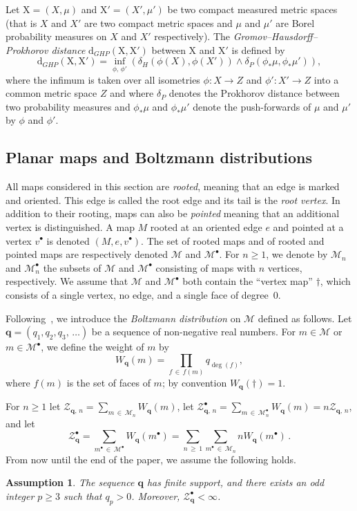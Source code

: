 \documentclass[AHL,Unicode,longabstracts,published]{cedram}
\newtheorem{assumption}{Assumption}
\newcommand{\bfq}{\mathbf{q}}
\newcommand{\cM}{\mathcal{M}}
\newcommand{\cZ}{\mathcal{Z}}
\newcommand{\rX}{\mathrm{X}}
\newcommand{\rXi}{\mathrm{X'}}
\newcommand{\rd}{\mathrm{d}}
\DeclareMathOperator{\Deg}{deg}
\newcommand{\sbt}{{\ensuremath{\scriptscriptstyle\bullet}}}
\begin{document}
Let $\rX=(X,\mu)$ and $\rXi=(X',\mu')$ be two compact measured metric spaces (that is $X$ and $X'$ are two compact metric spaces and $\mu$ and $\mu'$ are Borel probability measures on $X$ and $X'$ respectively). The \emph{Gromov--Hausdorff--Prokhorov distance} $\rd_{GHP}(\rX,\rXi)$ between $\rX$ and $\rXi$ is defined by
\[
\rd_{GHP}(\rX, \rXi)=\inf_{\phi,\,\phi'}\left(\delta_H\left(\phi(X),\phi(X')\right)\wedge \delta_P\left(\phi_*\mu,\phi_*\mu'\right)\right),
\]
where the infimum is taken over all isometries $\phi:X\rightarrow Z$ and $\phi':X'\rightarrow Z$ into a common metric space $Z$ and where $\delta_P$ denotes the Prokhorov distance between two probability measures and $\phi_*\mu$ and $\phi_*\mu'$ denote the push-forwards of $\mu$ and $\mu'$ by $\phi$ and $\phi'$.


\subsection{Planar maps and Boltzmann distributions}\label{sub:maps}

All maps considered in this section are \emph{rooted}, meaning that an edge is marked and oriented. This edge is called the root edge and its tail is the \emph{root vertex}. In addition to their rooting, maps can also be \emph{pointed} meaning that an additional vertex is distinguished. A map $M$ rooted at an oriented edge $e$ and pointed at a vertex $v^\sbt$ is denoted $(M,e,v^\sbt)$. The set of rooted maps and of rooted and pointed maps are respectively denoted $\cM$ and $\cM^\bullet$. For $n\geq 1$, we denote by $\cM_n$ and $\cM^\bullet_n$ the subsets of $\cM$ and $\cM^\bullet$ consisting of maps with $n$ vertices, respectively. We assume that $\cM$ and $\cM^\bullet$ both contain the ``vertex map'' $\dagger$, which consists of a single vertex, no edge, and a single face of degree~0.

Following~\cite{MiermontInvariance,MarckertMiermontInvariance}, we introduce the \emph{Boltzmann distribution} on $\cM$ defined as follows. Let $\bfq=(q_1,q_2,q_3,\,\ldots)$ be a sequence of non-negative real numbers. For $m\in \cM$ or $m\in \cM^\bullet$, we define the weight of $m$ by
\[
W_{\bfq}(m) = \prod_{f\,\in\,f(m)}q_{\Deg(f)},
\]
where $f(m)$ is the set of faces of $m$; by convention $W_{\bfq}(\dagger)=1$.

For $n \ge 1$ let $\cZ_{\bfq,\,n}=\sum_{m\,\in \,\cM_n}W_{\bfq}(m)$, let $\cZ^\bullet_{\bfq,\,n} = \sum_{m\,\in\,\cM^\bullet_n} W_{\bfq}(m) = n \cZ_{\bfq,\,n}$, and let
\[
\cZ^\bullet_{\bfq}=\sum_{m^\sbt\,\in\,\cM^\bullet}W_{\bfq}(m^\sbt) = \sum_{n\,\ge\,1}\sum_{m^\sbt\,\in\,\cM_n} nW_{\bfq}(m^\sbt)\,.
\]
From now until the end of the paper, we assume the following holds.
\setcounter{assumption}{0}
\begin{assumption}\label{assum:q}
The sequence $\bfq$ has finite support, and there exists an odd integer $p\geq 3$ such that $q_p>0$. Moreover, $\cZ_{\bfq}^{\bullet}<\infty$.
\end{assumption}
\end{document}

